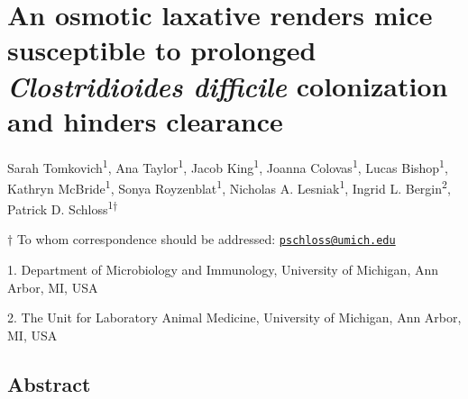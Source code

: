 \documentclass[
  11pt,
]{article}
\author{}
\date{\vspace{-2.5em}}
\begin{document}
\vspace{35mm}

\hypertarget{an-osmotic-laxative-renders-mice-susceptible-to-prolonged-clostridioides-difficile-colonization-and-hinders-clearance}{%
\section{\texorpdfstring{An osmotic laxative renders mice susceptible to
prolonged \emph{Clostridioides difficile} colonization and hinders
clearance}{An osmotic laxative renders mice susceptible to prolonged Clostridioides difficile colonization and hinders clearance}}\label{an-osmotic-laxative-renders-mice-susceptible-to-prolonged-clostridioides-difficile-colonization-and-hinders-clearance}}

\vspace{35mm}

Sarah Tomkovich\textsuperscript{1}, Ana Taylor\textsuperscript{1}, Jacob
King\textsuperscript{1}, Joanna Colovas\textsuperscript{1}, Lucas
Bishop\textsuperscript{1}, Kathryn McBride\textsuperscript{1}, Sonya
Royzenblat\textsuperscript{1}, Nicholas A. Lesniak\textsuperscript{1},
Ingrid L. Bergin\textsuperscript{2}, Patrick D.
Schloss\textsuperscript{1\(\dagger\)}

\vspace{40mm}

\(\dagger\) To whom correspondence should be addressed:
\href{mailto:pschloss@umich.edu}{\nolinkurl{pschloss@umich.edu}}

1. Department of Microbiology and Immunology, University of Michigan,
Ann Arbor, MI, USA

2. The Unit for Laboratory Animal Medicine, University of Michigan, Ann
Arbor, MI, USA

\newpage
\linenumbers

\hypertarget{abstract}{%
\subsection{Abstract}\label{abstract}}
\end{document}

